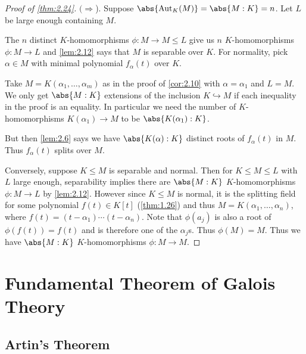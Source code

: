 \documentclass{article}
\DeclareMathOperator{\Aut}{Aut}
\begin{document}



\begin{proof}[Proof of \cref{thm:2.24}]
    $(\Rightarrow$). Suppose $\abs{\Aut_K(M)} = \abs{M:K} = n$.
    Let $L$ be large enough containing $M$.

    The $n$ distinct $K$-homomorphisms $\phi: M \to M \leq L$ give us $n$ $K$-homomorphisms $\phi:M \to L$ and \cref{lem:2.12} says that $M$ is separable over $K$.
    For normality, pick $\alpha \in M$ with minimal polynomial $f_\alpha(t)$ over $K$.

    Take $M = K(\alpha_1, \dotsc, \alpha_m)$ as in the proof of \cref{cor:2.10} with $\alpha = \alpha_1$ and $L = M$.
    We only get $\abs{M:K}$ extensions of the inclusion $K \hookrightarrow M$ if each inequality in the proof is an equality.
    In particular we need the number of $K$-homomorphisms $K(\alpha_1) \to M$ to be $\abs{K(\alpha_1):K}$.

    But then \cref{lem:2.6} says we have $\abs{K(\alpha):K}$ distinct roots of $f_\alpha(t)$ in $M$.
    Thus $f_\alpha(t)$ splits over $M$.

    Conversely, suppose $K \leq M$ is separable and normal.
    Then for $K \leq M \leq L$ with $L$ large enough, separability implies there are $\abs{M:K}$ $K$-homomorphisms $\phi:M \to L$ by \cref{lem:2.12}.
    However since $K \leq M$ is normal, it is the splitting field for some polynomial $f(t) \in K[t]$ (\cref{thm:1.26}) and thus $M = K(\alpha_1, \dotsc, \alpha_n)$, where $f(t) = (t - \alpha_1) \dotsm (t - \alpha_n)$.
    Note that $\phi(a_j)$ is also a root of $\phi(f(t)) = f(t)$ and is therefore one of the $\alpha_j$s.
    Thus $\phi(M) = M$. Thus we have $\abs{M:K}$ $K$-homomorphisms $\phi:M \to M$.
\end{proof}


\clearpage
\section{Fundamental Theorem of Galois Theory}
\subsection{Artin's Theorem}
\end{document}
